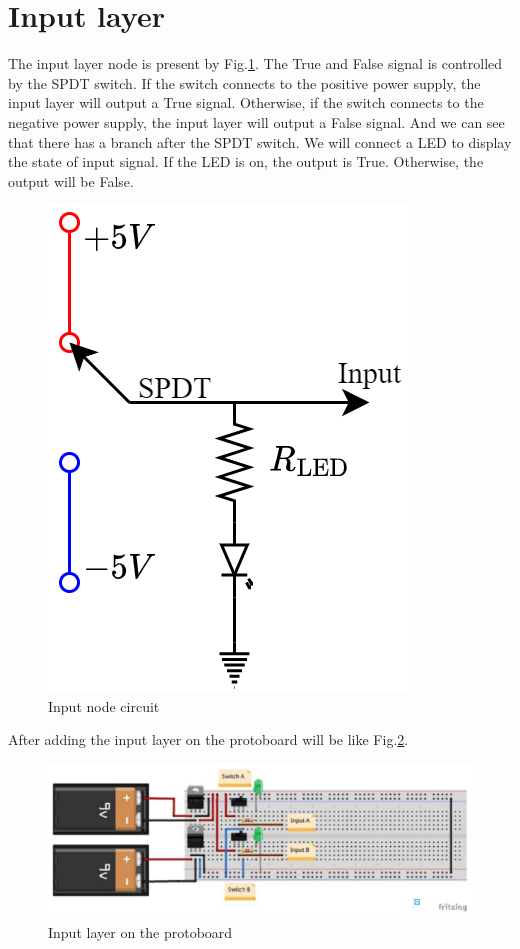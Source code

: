 \documentclass[a4paper, 12pt, AutoFakeBold]{report}
\newcommand{\figref}[1]{Fig.\ref{#1}}
\begin{document}
    \section{Input layer}
    The input layer node is present by \figref{fig:Input_layer}. The True and False signal is controlled by the SPDT switch. If the switch connects to the positive power supply, the input layer will output a True signal. Otherwise, if the switch connects to the negative power supply, the input layer will output a False signal. And we can see that there has a branch after the SPDT switch. We will connect a LED to display the state of input signal. If the LED is on, the output is True. Otherwise, the output will be False.
    \begin{figure}[H]
        \centering
        \includegraphics[scale=.7]{figs/Input_layer.png}
        \caption{Input node circuit}
        \label{fig:Input_layer}
    \end{figure}

    After adding the input layer on the protoboard will be like \figref{fig:Input_layer_onboard}.
    \begin{figure}[H]
        \centering
        \includegraphics[scale=.4]{figs/Input_layer_onboard.JPG}
        \caption{Input layer on the protoboard}
        \label{fig:Input_layer_onboard}
    \end{figure}
\end{document}
